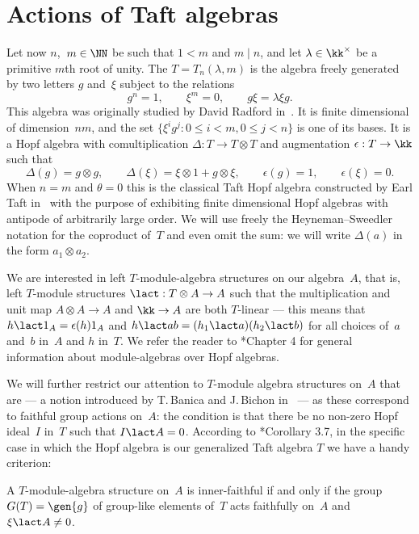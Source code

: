 \section{Actions of Taft algebras}
\label{sect:taft}

Let now $n$,~$m\in\NN$ be such that $1<m$ and $m\mid n$, and let
$\lambda\in\kk^\times$ be a primitive $m$th root of unity. The
 $T=T_n(\lambda,m)$ is the algebra
freely generated by two letters $g$ and~$\xi$ subject to the relations
  \[ \label{eq:T:rels}
  g^n = 1,
  \qquad
  \xi^m = 0,
  \qquad
  g\xi = \lambda\xi g.
  \]
This algebra was originally studied by David Radford in~\cite{Radford}.
It is finite dimensional of dimension~$nm$, and the set $\{\xi^ig^j:0\leq
i<m,0\leq j<n\}$ is one of its bases. It is a Hopf algebra with
comultiplication $\Delta:T\to T\otimes T$ and augmentation
$\epsilon:T\to\kk$ such that
  \[
  \Delta(g) = g\otimes g,
  \qquad
  \Delta(\xi) = \xi\otimes1+g\otimes\xi,
  \qquad
  \epsilon(g) = 1,
  \qquad
  \epsilon(\xi) = 0.
  \]
When $n=m$ and $\theta=0$ this is the classical Taft Hopf algebra
constructed by Earl Taft in~\cite{Taft} with the purpose of exhibiting
finite dimensional Hopf algebras with antipode of arbitrarily large order.
We will use freely the Heyneman--Sweedler notation for the coproduct of~$T$
and even omit the sum: we will write $\Delta(a)$ in the form $a_1\otimes
a_2$.

\bigskip

We are interested in left $T$-module-algebra structures on our algebra~$A$,
that is, left $T$\nobreakdash-module structures $\lact:T\otimes A\to A$
such that the multiplication and unit map $A\otimes A\to A$ and $\kk\to A$
are both $T$-linear --- this means that $h\lact 1_A=\epsilon(h)1_A$ and
$h\lact ab =(h_1\lact a)(h_2\lact b)$ for all choices of~$a$ and~$b$
in~$A$ and $h$ in~$T$. We refer the reader to \cite{Montgomery}*{Chapter 4}
for general information about module-algebras over Hopf algebras.

We will further restrict our attention to $T$-module algebra structures
on~$A$ that are  --- a notion introduced by
T.\,Banica and J.\,Bichon in~\cite{BB} ---  as these correspond to faithful
group actions on~$A$: the condition is that there be no non-zero Hopf
ideal~$I$ in~$T$ such that $I\lact A=0$. According to
\cite{Cline}*{Corollary 3.7}, in the specific case in which the Hopf
algebra is our generalized Taft algebra $T$ we have a handy criterion:

\begin{claim}\label{eq:faithful}
  A $T$-module-algebra structure on~$A$ is inner-faithful if and
  only if the group $G(T)=\gen{g}$ of group-like elements of~$T$ acts
  faithfully on~$A$ and $\xi\lact A\neq0$.
\end{claim}

